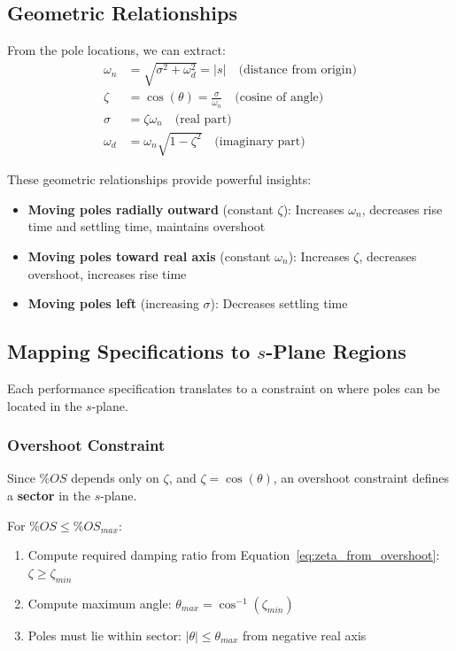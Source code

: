 \subsection{Geometric Relationships}

From the pole locations, we can extract:
\begin{align}
    \omega_n &= \sqrt{\sigma^2 + \omega_d^2} = |s| \quad \text{(distance from origin)} \\
    \zeta &= \cos(\theta) = \frac{\sigma}{\omega_n} \quad \text{(cosine of angle)} \\
    \sigma &= \zeta\omega_n \quad \text{(real part)} \\
    \omega_d &= \omega_n\sqrt{1-\zeta^2} \quad \text{(imaginary part)}
\end{align}

These geometric relationships provide powerful insights:
\begin{itemize}
    \item \textbf{Moving poles radially outward} (constant $\zeta$): Increases $\omega_n$, decreases rise time and settling time, maintains overshoot
    \item \textbf{Moving poles toward real axis} (constant $\omega_n$): Increases $\zeta$, decreases overshoot, increases rise time
    \item \textbf{Moving poles left} (increasing $\sigma$): Decreases settling time
\end{itemize}

\subsection{Mapping Specifications to $s$-Plane Regions}

Each performance specification translates to a constraint on where poles can be located in the $s$-plane.

\subsubsection{Overshoot Constraint}

Since $\%OS$ depends only on $\zeta$, and $\zeta = \cos(\theta)$, an overshoot constraint defines a \textbf{sector} in the $s$-plane.

For $\%OS \leq \%OS_{max}$:
\begin{enumerate}
    \item Compute required damping ratio from Equation~\eqref{eq:zeta_from_overshoot}: $\zeta \geq \zeta_{min}$
    \item Compute maximum angle: $\theta_{max} = \cos^{-1}(\zeta_{min})$
    \item Poles must lie within sector: $|\theta| \leq \theta_{max}$ from negative real axis
\end{enumerate}

